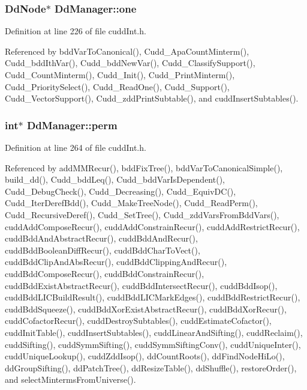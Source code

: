 \subsubsection{\setlength{\rightskip}{0pt plus 5cm}\bf{Dd\-Node}$\ast$ \bf{Dd\-Manager::one}}\label{structDdManager_239bd99ee654742adc79b8299c2bc92e}




Definition at line 226 of file cudd\-Int.h.

Referenced by bdd\-Var\-To\-Canonical(), Cudd\_\-Apa\-Count\-Minterm(), Cudd\_\-bdd\-Ith\-Var(), Cudd\_\-bdd\-New\-Var(), Cudd\_\-Classify\-Support(), Cudd\_\-Count\-Minterm(), Cudd\_\-Init(), Cudd\_\-Print\-Minterm(), Cudd\_\-Priority\-Select(), Cudd\_\-Read\-One(), Cudd\_\-Support(), Cudd\_\-Vector\-Support(), Cudd\_\-zdd\-Print\-Subtable(), and cudd\-Insert\-Subtables().
\subsubsection{\setlength{\rightskip}{0pt plus 5cm}int$\ast$ \bf{Dd\-Manager::perm}}\label{structDdManager_299d281a98c60aeec0e8edf6671a0f51}




Definition at line 264 of file cudd\-Int.h.

Referenced by add\-MMRecur(), bdd\-Fix\-Tree(), bdd\-Var\-To\-Canonical\-Simple(), build\_\-dd(), Cudd\_\-bdd\-Leq(), Cudd\_\-bdd\-Var\-Is\-Dependent(), Cudd\_\-Debug\-Check(), Cudd\_\-Decreasing(), Cudd\_\-Equiv\-DC(), Cudd\_\-Iter\-Deref\-Bdd(), Cudd\_\-Make\-Tree\-Node(), Cudd\_\-Read\-Perm(), Cudd\_\-Recursive\-Deref(), Cudd\_\-Set\-Tree(), Cudd\_\-zdd\-Vars\-From\-Bdd\-Vars(), cudd\-Add\-Compose\-Recur(), cudd\-Add\-Constrain\-Recur(), cudd\-Add\-Restrict\-Recur(), cudd\-Bdd\-And\-Abstract\-Recur(), cudd\-Bdd\-And\-Recur(), cudd\-Bdd\-Boolean\-Diff\-Recur(), cudd\-Bdd\-Char\-To\-Vect(), cudd\-Bdd\-Clip\-And\-Abs\-Recur(), cudd\-Bdd\-Clipping\-And\-Recur(), cudd\-Bdd\-Compose\-Recur(), cudd\-Bdd\-Constrain\-Recur(), cudd\-Bdd\-Exist\-Abstract\-Recur(), cudd\-Bdd\-Intersect\-Recur(), cudd\-Bdd\-Isop(), cudd\-Bdd\-LICBuild\-Result(), cudd\-Bdd\-LICMark\-Edges(), cudd\-Bdd\-Restrict\-Recur(), cudd\-Bdd\-Squeeze(), cudd\-Bdd\-Xor\-Exist\-Abstract\-Recur(), cudd\-Bdd\-Xor\-Recur(), cudd\-Cofactor\-Recur(), cudd\-Destroy\-Subtables(), cudd\-Estimate\-Cofactor(), cudd\-Init\-Table(), cudd\-Insert\-Subtables(), cudd\-Linear\-And\-Sifting(), cudd\-Reclaim(), cudd\-Sifting(), cudd\-Symm\-Sifting(), cudd\-Symm\-Sifting\-Conv(), cudd\-Unique\-Inter(), cudd\-Unique\-Lookup(), cudd\-Zdd\-Isop(), dd\-Count\-Roots(), dd\-Find\-Node\-Hi\-Lo(), dd\-Group\-Sifting(), dd\-Patch\-Tree(), dd\-Resize\-Table(), dd\-Shuffle(), restore\-Order(), and select\-Minterms\-From\-Universe().
